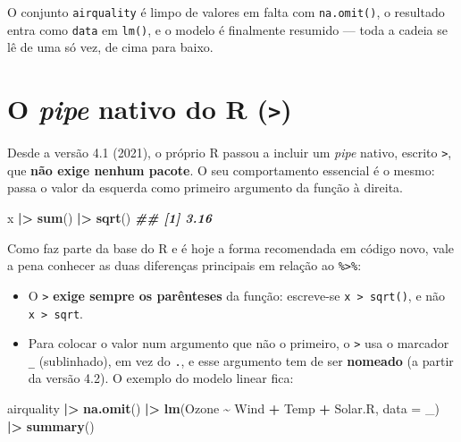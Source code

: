 \documentclass[
  portuguese,
  11pt,
  openany]{book}
\newenvironment{Shaded}{\begin{snugshade}}{\end{snugshade}}
\newcommand{\AttributeTok}[1]{\textcolor[rgb]{0.13,0.29,0.53}{#1}}
\newcommand{\DocumentationTok}[1]{\textcolor[rgb]{0.56,0.35,0.01}{\textbf{\textit{#1}}}}
\newcommand{\FunctionTok}[1]{\textcolor[rgb]{0.13,0.29,0.53}{\textbf{#1}}}
\newcommand{\NormalTok}[1]{#1}
\newcommand{\SpecialCharTok}[1]{\textcolor[rgb]{0.81,0.36,0.00}{\textbf{#1}}}
\providecommand{\tightlist}{%
  \setlength{\itemsep}{0pt}\setlength{\parskip}{0pt}}
\begin{document}
O conjunto \texttt{airquality} é limpo de valores em falta com \texttt{na.omit()}, o resultado
entra como \texttt{data} em \texttt{lm()}, e o modelo é finalmente resumido --- toda a cadeia se lê
de uma só vez, de cima para baixo.

\section{\texorpdfstring{O \emph{pipe} nativo do R (\texttt{\textbar{}\textgreater{}})}{O pipe nativo do R (\textbar\textgreater)}}\label{o-pipe-nativo-do-r}

Desde a versão 4.1 (2021), o próprio R passou a incluir um \emph{pipe} nativo, escrito
\texttt{\textbar{}\textgreater{}}, que \textbf{não exige nenhum pacote}. O seu comportamento essencial é o mesmo:
passa o valor da esquerda como primeiro argumento da função à direita.

\begin{Shaded}
\begin{Highlighting}[]
\NormalTok{x }\SpecialCharTok{|\textgreater{}} \FunctionTok{sum}\NormalTok{() }\SpecialCharTok{|\textgreater{}} \FunctionTok{sqrt}\NormalTok{()}
\DocumentationTok{\#\# [1] 3.16}
\end{Highlighting}
\end{Shaded}

Como faz parte da base do R e é hoje a forma recomendada em código novo, vale a pena
conhecer as duas diferenças principais em relação ao \texttt{\%\textgreater{}\%}:

\begin{itemize}
\tightlist
\item
  O \texttt{\textbar{}\textgreater{}} \textbf{exige sempre os parênteses} da função: escreve-se \texttt{x\ \textbar{}\textgreater{}\ sqrt()}, e não
  \texttt{x\ \textbar{}\textgreater{}\ sqrt}.
\item
  Para colocar o valor num argumento que não o primeiro, o \texttt{\textbar{}\textgreater{}} usa o marcador \texttt{\_}
  (sublinhado), em vez do \texttt{.}, e esse argumento tem de ser \textbf{nomeado} (a partir da
  versão 4.2). O exemplo do modelo linear fica:
\end{itemize}

\begin{Shaded}
\begin{Highlighting}[]
\NormalTok{airquality }\SpecialCharTok{|\textgreater{}}
  \FunctionTok{na.omit}\NormalTok{() }\SpecialCharTok{|\textgreater{}}
  \FunctionTok{lm}\NormalTok{(Ozone }\SpecialCharTok{\textasciitilde{}}\NormalTok{ Wind }\SpecialCharTok{+}\NormalTok{ Temp }\SpecialCharTok{+}\NormalTok{ Solar.R, }\AttributeTok{data =}\NormalTok{ \_) }\SpecialCharTok{|\textgreater{}}
  \FunctionTok{summary}\NormalTok{()}
\end{Highlighting}
\end{Shaded}
\end{document}
